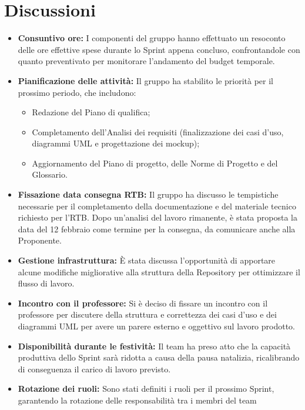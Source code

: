 \documentclass[a4paper,12pt]{article}
\begin{document}
\section{Discussioni}
\begin{itemize}
    \item \textbf{Consuntivo ore:} I componenti del gruppo hanno effettuato un resoconto delle ore effettive spese durante lo Sprint appena concluso, confrontandole con quanto preventivato per monitorare l'andamento del budget temporale.
    \item \textbf{Pianificazione delle attività:} Il gruppo ha stabilito le priorità per il prossimo periodo, che includono:
    \begin{itemize}
        \item Redazione del Piano di qualifica;
        \item Completamento dell'Analisi dei requisiti (finalizzazione dei casi d'uso, diagrammi UML e progettazione dei mockup);
        \item Aggiornamento del Piano di progetto, delle Norme di Progetto e del Glossario.
    \end{itemize}
    \item \textbf{Fissazione data consegna RTB:} Il gruppo ha discusso le tempistiche necessarie per il completamento della documentazione e del materiale tecnico richiesto per l'RTB. Dopo un'analisi del lavoro rimanente, è stata proposta la data del 12 febbraio come termine per la consegna, da comunicare anche alla Proponente.
    \item \textbf{Gestione infrastruttura:} È stata discussa l'opportunità di apportare alcune modifiche migliorative alla struttura della Repository per ottimizzare il flusso di lavoro.
    \item \textbf{Incontro con il professore:} Si è deciso di fissare un incontro con il professore per discutere della struttura e correttezza dei casi d'uso e dei diagrammi UML per avere un parere esterno e oggettivo sul lavoro prodotto.
    \item \textbf{Disponibilità durante le festività:} Il team ha preso atto che la capacità produttiva dello Sprint sarà ridotta a causa della pausa natalizia, ricalibrando di conseguenza il carico di lavoro previsto.
    \item \textbf{Rotazione dei ruoli:} Sono stati definiti i ruoli per il prossimo Sprint, garantendo la rotazione delle responsabilità tra i membri del team
\end{itemize}
\end{document}
